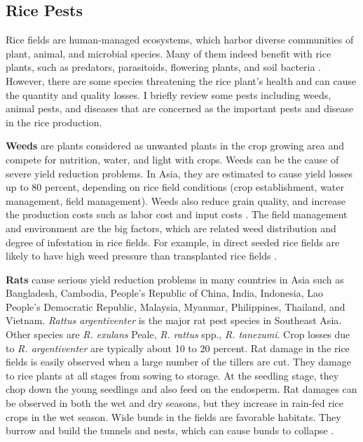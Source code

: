 \subsection*{Rice Pests}

Rice fields are human-managed ecosystems, which harbor diverse communities of plant, animal, and microbial species. Many of them indeed benefit with rice plants, such as predators, parasitoids, flowering plants, and soil bacteria \citep{Norton_2010_Rice}. However, there are some species threatening the rice plant's health and can cause the quantity and quality losses. I briefly review some pests including weeds, animal pests, and diseases that are concerned as the important pests and disease in the rice production.


\textbf{Weeds} are plants considered as unwanted plants in the crop growing area and compete for nutrition, water, and light with crops. Weeds can be the cause of severe yield reduction problems. In Asia, they are estimated to cause yield losses up to 80 percent, depending on rice field conditions (crop establishment, water management, field management). Weeds also reduce grain quality, and increase the production costs such as labor cost and input costs \citep{Litsinger_1991_Crop,Savary_2005_Multiple}. The field management and environment are the big factors, which are related weed distribution and degree of infestation in rice fields. For example, in direct seeded rice fields are likely to have high weed pressure than transplanted rice fields \cite{Juraimi_2013_Sustainable}.

\textbf{Rats} cause serious yield reduction problems in many countries in Asia such as Bangladesh, Cambodia, People's Republic of China, India, Indonesia, Lao People's Democratic Republic, Malaysia, Myanmar, Philippines, Thailand, and Vietnam. \textit{Rattus argentiventer} is the major rat pest species in Southeast Asia. Other species are \textit{R. exulans} Peale, \textit{ R. rattus} spp., \textit{R. tanezumi}.  Crop losses due to \textit{R. argentiventer} are typically about 10 to 20 percent. Rat damage in the rice fields is easily observed when a large number of the tillers are cut. They damage to rice plants at all stages from sowing to storage. At the seedling stage, they chop down the young seedlings and also feed on the endosperm. Rat damages can be observed in both the wet and dry seasons, but they increase in rain-fed rice crops in the wet season. Wide bunds in the fields are favorable habitats. They burrow and build the tunnels and nests, which can cause bunds to collapse \citep{Singleton_2003_Impacts}.


